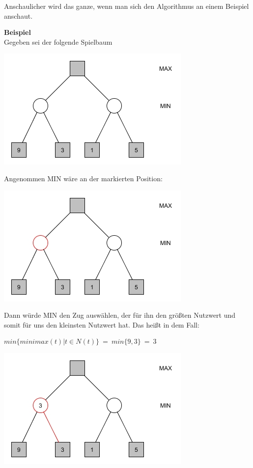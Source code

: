 Anschaulicher wird das ganze, wenn man sich den Algorithmus an einem Beispiel anschaut.
\\

\newpage


\textbf{Beispiel}\\

Gegeben sei der folgende Spielbaum
\begin{center}
\includegraphics[width = 7 cm]{chapters/minimax/jpg/Graph-Minmax1.jpg}
\end{center}

Angenommen MIN wäre an der markierten Position:
\begin{center}
	\includegraphics[width = 7 cm]{chapters/minimax/jpg/Graph-Minmax2-1.jpg}
\end{center}

Dann würde MIN den Zug auswählen, der für ihn den größten Nutzwert und somit für uns den kleinsten Nutzwert hat. Das heißt in dem Fall:
\begin{center}
	 $min\{minimax(t) | t \in N(t)\} ~=~ min\{9,3\} ~=~ 3$

\includegraphics[width = 7 cm]{chapters/minimax/jpg/Graph-Minmax2-2.jpg}
\end{center}


